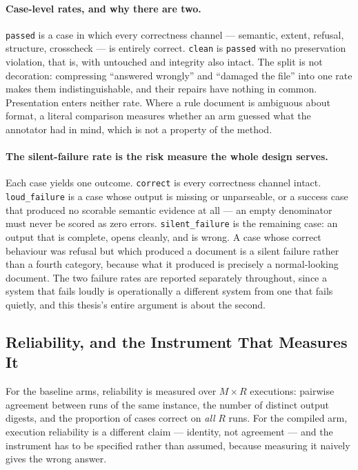 \paragraph{Case-level rates, and why there are two.}
\texttt{passed} is a case in which every correctness channel --- semantic, extent, refusal,
structure, crosscheck --- is entirely correct. \texttt{clean} is \texttt{passed} with no preservation
violation, that is, with untouched and integrity also intact. The split is not decoration:
compressing ``answered wrongly'' and ``damaged the file'' into one rate makes them
indistinguishable, and their repairs have nothing in common. Presentation enters neither rate.
Where a rule document is ambiguous about format, a literal comparison measures whether an arm
guessed what the annotator had in mind, which is not a property of the method.

\paragraph{The silent-failure rate is the risk measure the whole design serves.}
Each case yields one outcome. \texttt{correct} is every correctness channel intact.
\texttt{loud\_failure} is a case whose output is missing or unparseable, or a success case
that produced no scorable semantic evidence at all --- an empty denominator must never be
scored as zero errors. \texttt{silent\_failure} is the remaining case: an output that is
complete, opens cleanly, and is wrong. A case whose correct behaviour was refusal but which
produced a document is a silent failure rather than a fourth category, because what it
produced is precisely a normal-looking document. The two failure rates are reported
separately throughout, since a system that fails loudly is operationally a different system
from one that fails quietly, and this thesis's entire argument is about the second.

\subsection{Reliability, and the Instrument That Measures It}

For the baseline arms, reliability is measured over $M \times R$ executions: pairwise
agreement between runs of the same instance, the number of distinct output digests, and the
proportion of cases correct on \emph{all} $R$ runs. For the compiled arm, execution
reliability is a different claim --- identity, not agreement --- and the instrument has to be
specified rather than assumed, because measuring it naively gives the wrong answer.

